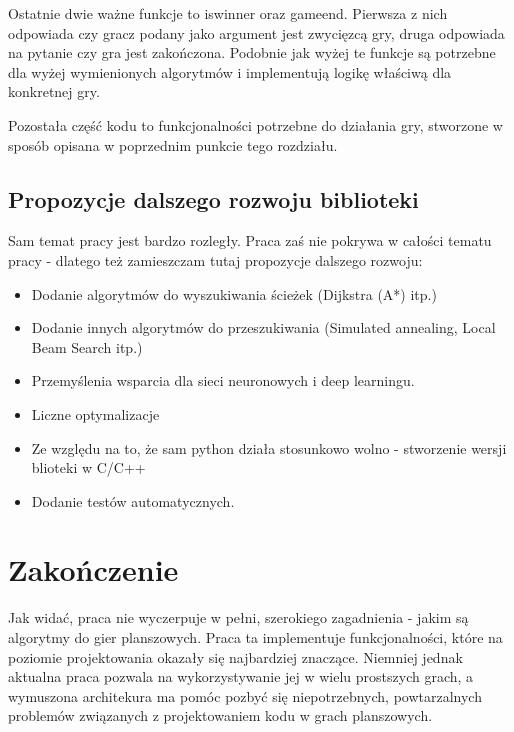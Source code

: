 \documentclass[declaration,shortabstract,inz]{iithesis}
\begin{document}
Ostatnie dwie ważne funkcje to is\textunderscore winner oraz game\textunderscore end.
Pierwsza z nich odpowiada czy gracz podany jako argument jest zwycięzcą gry, druga odpowiada na pytanie czy gra jest zakończona.
Podobnie jak wyżej te funkcje są potrzebne dla wyżej wymienionych algorytmów i implementują logikę właściwą dla konkretnej gry.

Pozostała część kodu to funkcjonalności potrzebne do działania gry, stworzone w sposób opisana w poprzednim punkcie tego rozdziału.

\section{Propozycje dalszego rozwoju biblioteki}
Sam temat pracy jest bardzo rozległy.
Praca zaś nie pokrywa w całości tematu pracy - dlatego też zamieszczam tutaj propozycje dalszego rozwoju:
\begin{itemize}
  \item Dodanie algorytmów do wyszukiwania ścieżek (Dijkstra (A*) itp.)
  \item Dodanie innych algorytmów do przeszukiwania (Simulated annealing, Local Beam Search itp.)
  \item Przemyślenia wsparcia dla sieci neuronowych i deep learningu.
  \item Liczne optymalizacje
  \item Ze względu na to, że sam python działa stosunkowo wolno - stworzenie wersji blioteki w C/C++
  \item Dodanie testów automatycznych.
\end{itemize}

\chapter{Zakończenie}

Jak widać, praca nie wyczerpuje w pełni, szerokiego zagadnienia - jakim są algorytmy do gier planszowych.
Praca ta implementuje funkcjonalności, które na poziomie projektowania okazały się najbardziej znaczące.
Niemniej jednak aktualna praca pozwala na wykorzystywanie jej w wielu prostszych grach, a wymuszona architekura ma pomóc pozbyć się niepotrzebnych, powtarzalnych problemów związanych z projektowaniem kodu w grach planszowych.


\end{document}
